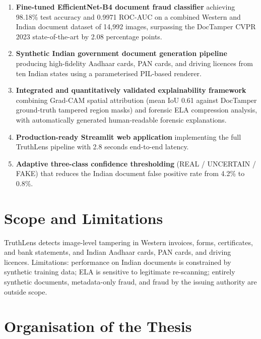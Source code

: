 \documentclass[12pt,a4paper,oneside]{report}
\begin{document}
\begin{enumerate}[label=\textbf{C\arabic*:}]

\item \textbf{Fine-tuned EfficientNet-B4 document fraud classifier} achieving
98.18\% test accuracy and 0.9971 ROC-AUC on a combined Western and Indian
document dataset of 14,992 images, surpassing the DocTamper CVPR 2023
state-of-the-art by 2.08 percentage points.

\item \textbf{Synthetic Indian government document generation pipeline}
producing high-fidelity Aadhaar cards, PAN cards, and driving licences
from ten Indian states using a parameterised PIL-based renderer.

\item \textbf{Integrated and quantitatively validated explainability framework}
combining Grad-CAM spatial attribution (mean IoU 0.61 against DocTamper
ground-truth tampered region masks) and forensic ELA compression analysis,
with automatically generated human-readable forensic explanations.

\item \textbf{Production-ready Streamlit web application} implementing the
full TruthLens pipeline with 2.8 seconds end-to-end latency.

\item \textbf{Adaptive three-class confidence thresholding} (REAL / UNCERTAIN
/ FAKE) that reduces the Indian document false positive rate from 4.2\% to
0.8\%.

\end{enumerate}

\section{Scope and Limitations}

TruthLens detects image-level tampering in Western invoices, forms,
certificates, and bank statements, and Indian Aadhaar cards, PAN cards,
and driving licences. Limitations: performance on Indian documents is
constrained by synthetic training data; ELA is sensitive to legitimate
re-scanning; entirely synthetic documents, metadata-only fraud, and
fraud by the issuing authority are outside scope.

\section{Organisation of the Thesis}
\end{document}
